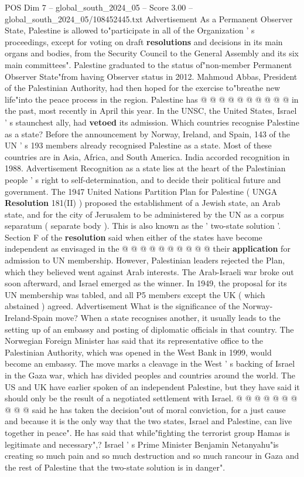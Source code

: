 \begin{textsample}{POS Dim 7 – global\_south\_2024\_05 – Score 3.00 – global\_south\_2024\_05/108452445.txt}
Advertisement As a Permanent Observer State, Palestine is allowed to"participate in all of the Organization ' s proceedings, except for voting on draft \textbf{resolutions} and decisions in its main organs and bodies, from the Security Council to the General Assembly and its six main committees".
Palestine graduated to the status of"non-member Permanent Observer State"from having Observer status in 2012.
Mahmoud Abbas, President of the Palestinian Authority, had then hoped for the exercise to"breathe new life"into the peace process in the region.
Palestine has @ @ @ @ @ @ @ @ @ @ in the past, most recently in April this year.
In the UNSC, the United States, Israel ' s staunchest ally, had \textbf{vetoed} its admission.
Which countries recognise Palestine as a state?
Before the announcement by Norway, Ireland, and Spain, 143 of the UN ' s 193 members already recognised Palestine as a state.
Most of these countries are in Asia, Africa, and South America.
India accorded recognition in 1988.
Advertisement Recognition as a state lies at the heart of the Palestinian people ' s right to self-determination, and to decide their political future and government.
The 1947 United Nations Partition Plan for Palestine ( UNGA \textbf{Resolution} 181(II) ) proposed the establishment of a Jewish state, an Arab state, and for the city of Jerusalem to be administered by the UN as a corpus separatum ( separate body ).
This is also known as the ' two-state solution '.
Section F of the \textbf{resolution} said when either of the states have become independent as envisaged in the @ @ @ @ @ @ @ @ @ @ their \textbf{application} for admission to UN membership.
However, Palestinian leaders rejected the Plan, which they believed went against Arab interests.
The Arab-Israeli war broke out soon afterward, and Israel emerged as the winner.
In 1949, the proposal for its UN membership was tabled, and all P5 members except the UK ( which abstained ) agreed.
Advertisement What is the significance of the Norway-Ireland-Spain move?
When a state recognises another, it usually leads to the setting up of an embassy and posting of diplomatic officials in that country.
The Norwegian Foreign Minister has said that its representative office to the Palestinian Authority, which was opened in the West Bank in 1999, would become an embassy.
The move marks a cleavage in the West ' s backing of Israel in the Gaza war, which has divided peoples and countries around the world.
The US and UK have earlier spoken of an independent Palestine, but they have said it should only be the result of a negotiated settlement with Israel. @ @ @ @ @ @ @ @ @ @ said he has taken the decision"out of moral conviction, for a just cause and because it is the only way that the two states, Israel and Palestine, can live together in peace".
He has said that while"fighting the terrorist group Hamas is legitimate and necessary",?
Israel ' s Prime Minister Benjamin Netanyahu"is creating so much pain and so much destruction and so much rancour in Gaza and the rest of Palestine that the two-state solution is in danger".

\end{textsample}
